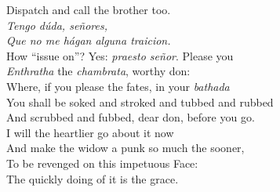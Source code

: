 \documentclass[a4paper,oneside,12pt]{memoir}
\begin{document}
\begin{drama*}
Dispatch and call the brother too.\\
\surlyspeaks {} \emph{Tengo d\'{u}da, se\~{n}ores,\\
Que no me h\'{a}gan alguna traicion.}\\
\subtlespeaks How ``issue on''? Yes: \emph{praesto se\~{n}or}. Please you\\
\emph{Enthratha} the \emph{chambrata}, worthy don:\\
Where, if you please the fates, in your \emph{bathada}\\
You shall be soked and stroked and tubbed and rubbed\\
And scrubbed and fubbed, dear don, before you go.\\
I will the heartlier go about it now\\
And make the widow a punk so much the sooner,\\
To be revenged on this impetuous Face:\\
The quickly doing of it is the grace.\\

\scene


\end{drama*}
\end{document}
